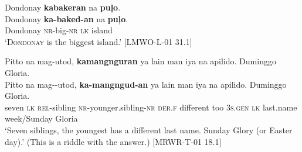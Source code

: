 \ea
Dondonay  \textbf{kabakeran}  na  \textbf{puļo}. \\\smallskip \gll Dondonay  \textbf{ka-baked-an}  na  \textbf{puļo}. \\
Dondonay  \textsc{nr}-big-\textsc{nr}  \textsc{lk}  island \\
\glt ‘\textsc{Dondonay} is the biggest island.’ [LMWO-L-01 31.1]
\z

\ea
Pitto  na  mag-utod,  \textbf{kamangnguran}  ya  lain man  iya  na  apilido.  Duminggo  Gloria. \\\smallskip \gll Pitto  na  mag-{}-utod,  \textbf{ka-mangngud-an}  ya  lain man  iya  na  apilido.  Duminggo  Gloria. \\
seven  \textsc{lk}  \textsc{rel}-sibling  \textsc{nr}-younger.sibling-\textsc{nr}  \textsc{der.f}  different
too  3\textsc{s.gen}  \textsc{lk}  last.name  week/Sunday  Gloria \\
\glt ‘Seven siblings, the youngest has a different last name. Sunday Glory (or Easter day).’ (This is a riddle with the answer.) [MRWR-T-01 18.1] 
 
\z

